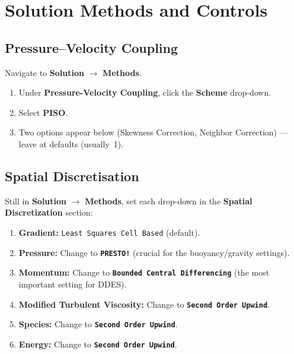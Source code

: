 \documentclass[12pt,a4paper]{report}
\begin{document}
\chapter{Solution Methods and Controls}
\label{ch:solution}

\section{Pressure--Velocity Coupling}

Navigate to \textbf{Solution} $\rightarrow$ \textbf{Methods}.

\begin{enumerate}
  \item Under \textbf{Pressure-Velocity Coupling}, click the
        \textbf{Scheme} drop-down.
  \item Select \textbf{PISO}.
  \item Two options appear below (Skewness Correction, Neighbor
        Correction) --- leave at defaults (usually~1).
\end{enumerate}

\section{Spatial Discretisation}

Still in \textbf{Solution} $\rightarrow$ \textbf{Methods}, set each
drop-down in the \textbf{Spatial Discretization} section:

\begin{enumerate}
  \item \textbf{Gradient:} \texttt{Least Squares Cell Based} (default).
  \item \textbf{Pressure:} Change to \textbf{\texttt{PRESTO!}}
        \quad(crucial for the buoyancy/gravity settings).
  \item \textbf{Momentum:} Change to \textbf{\texttt{Bounded Central
        Differencing}} \quad(the most important setting for DDES).
  \item \textbf{Modified Turbulent Viscosity:} Change to
        \textbf{\texttt{Second Order Upwind}}.
  \item \textbf{Species:} Change to
        \textbf{\texttt{Second Order Upwind}}.
  \item \textbf{Energy:} Change to
        \textbf{\texttt{Second Order Upwind}}.
\end{enumerate}
\end{document}

